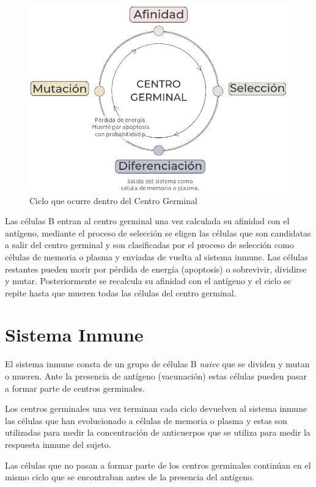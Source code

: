 \begin{figure}[H] %
    \centering
    \includegraphics[width=1\textwidth]{Graphics/gc.png}
    \caption{Ciclo que ocurre dentro del Centro Germinal}
    \label{fig:cg}
\end{figure}

Las células B entran al centro germinal una vez calculada su afinidad con el antígeno, mediante el proceso de selección se eligen las células que son candidatas a salir del centro germinal y son clasificadas por el proceso de selección como células de memoria o plasma y enviadas de vuelta al sistema inmune. Las células restantes pueden morir por pérdida de energía (apoptosis) o sobrevivir, dividirse y mutar. Posteriormente se recalcula su afinidad con el antígeno y el ciclo se repite hasta que mueren todas las células del centro germinal.

\section{Sistema Inmune}

El sistema inmune consta de un grupo de células B \textit{naive} que se dividen y mutan o mueren. Ante la presencia de antígeno (vacunación) estas células pueden pasar a formar parte de centros germinales. 

Los centros germinales una vez terminan cada ciclo devuelven al sistema inmune las células que han evolucionado a células de memoria o plasma y estas son utilizadas para medir la concentración de anticuerpos que se utiliza para medir la respuesta inmune del sujeto.

Las células que no pasan a formar parte de los centros germinales continúan en el mismo ciclo que se encontraban antes de la presencia del antígeno.

